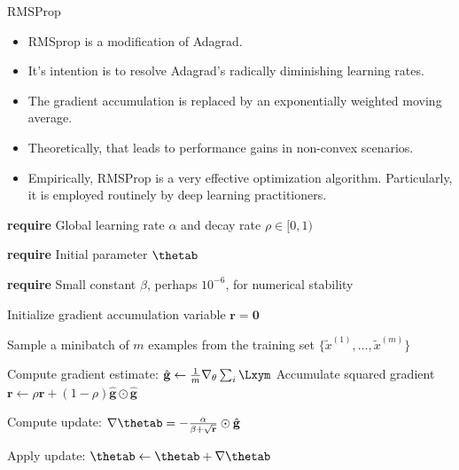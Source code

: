 
\begin{vbframe}{RMSProp}
  \begin{itemize}
    \item RMSprop is a modification of Adagrad.
    \item It's intention is to resolve Adagrad's radically diminishing learning rates.
    \item The gradient accumulation is replaced by an exponentially weighted moving average.
    \item Theoretically, that leads to performance gains in non-convex scenarios.
    \item Empirically, RMSProp is a very effective optimization algorithm. Particularly, it is employed routinely by deep learning practitioners.
  \end{itemize}
  
\framebreak
  
  
  \begin{algorithm}[H]
    \small
    \caption{RMSProp}
    \begin{algorithmic}[1]
    \State \textbf{require} Global learning rate $\alpha$ and decay rate $\rho \in [0, 1)$ \strut
    \State \textbf{require} Initial parameter $\mathbf{\thetab}$ \strut
    \State \parbox[t]{\dimexpr\linewidth-\algorithmicindent}{\textbf{require} Small constant $\beta$, perhaps $10^{-6}$, for numerical stability \strut}
    \State Initialize gradient accumulation variable $\mathbf{r} = \mathbf{0} $
        \State \parbox[t]{\dimexpr\linewidth-\algorithmicindent}{Sample a minibatch of $m$ examples from the training set $\{\tilde{x}^{(1)},\dots,\tilde{x}^{(m)}\}$ \strut}
        \State Compute gradient estimate: $\hat{\mathbf{g}} \leftarrow \frac{1}{m} \nabla_\theta \sum_{i} \Lxym$
        \State Accumulate squared gradient $\mathbf{r} \leftarrow \rho \mathbf{r} + (1 - \rho) \hat{\mathbf{g}} \odot  \hat{\mathbf{g}}$
        \State \parbox[t]{\dimexpr\linewidth-\algorithmicindent}{Compute update: $\nabla\mathbf{\thetab} = - \frac{\alpha}{\beta + \sqrt\mathbf{r}} \odot \hat{\mathbf{g}}$ \strut}
        \State Apply update: $\mathbf{\thetab} \leftarrow \mathbf{\thetab} + \nabla\mathbf{\thetab}$
      \EndWhile
    \end{algorithmic}
  \end{algorithm}
\end{vbframe}

